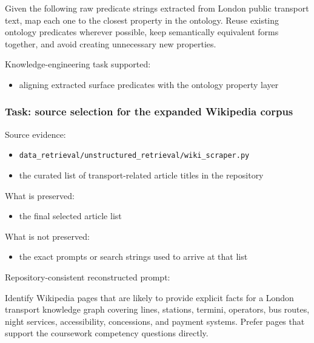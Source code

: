 \documentclass[
  11pt,
  a4paper,
]{article}
\newenvironment{Shaded}{}{}
\newcommand{\NormalTok}[1]{#1}
\providecommand{\tightlist}{%
  \setlength{\itemsep}{0pt}\setlength{\parskip}{0pt}}
\begin{document}
\begin{Shaded}
\begin{Highlighting}[]
\NormalTok{Given the following raw predicate strings extracted from London public transport text, map each one to the closest property in the ontology. Reuse existing ontology predicates wherever possible, keep semantically equivalent forms together, and avoid creating unnecessary new properties.}
\end{Highlighting}
\end{Shaded}

Knowledge-engineering task supported:

\begin{itemize}
\tightlist
\item
  aligning extracted surface predicates with the ontology property layer
\end{itemize}

\subsubsection{Task: source selection for the expanded Wikipedia
corpus}\label{task-source-selection-for-the-expanded-wikipedia-corpus}

Source evidence:

\begin{itemize}
\tightlist
\item
  \texttt{data\_retrieval/unstructured\_retrieval/wiki\_scraper.py}
\item
  the curated list of transport-related article titles in the repository
\end{itemize}

What is preserved:

\begin{itemize}
\tightlist
\item
  the final selected article list
\end{itemize}

What is not preserved:

\begin{itemize}
\tightlist
\item
  the exact prompts or search strings used to arrive at that list
\end{itemize}

Repository-consistent reconstructed prompt:

\begin{Shaded}
\begin{Highlighting}[]
\NormalTok{Identify Wikipedia pages that are likely to provide explicit facts for a London transport knowledge graph covering lines, stations, termini, operators, bus routes, night services, accessibility, concessions, and payment systems. Prefer pages that support the coursework competency questions directly.}
\end{Highlighting}
\end{Shaded}
\end{document}
